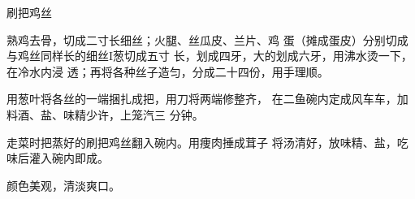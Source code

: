 \begin{recipe}{刷把鸡丝}

\ingredients





\cooking

\step 熟鸡去骨，切成二寸长细丝；火腿、丝瓜皮、兰片、鸡 蛋（摊成蛋皮）分别切成与鸡丝同样长的细丝I葱切成五寸 长，划成四牙，大的划成六牙，用沸水烫一下，在冷水内浸 透；再将各种丝子造匀，分成二十四份，用手理顺。

用葱叶将各丝的一端捆扎成把，用刀将两端修整齐， 在二鱼碗内定成风车车，加料酒、盐、味精少许，上笼汽三 分钟。

走菜时把蒸好的刷把鸡丝翻入碗内。用痩肉捶成茸子 将汤清好，放味精、盐，吃味后灌入碗内即成。

\notes

颜色美观，清淡爽口。

\end{recipe}

